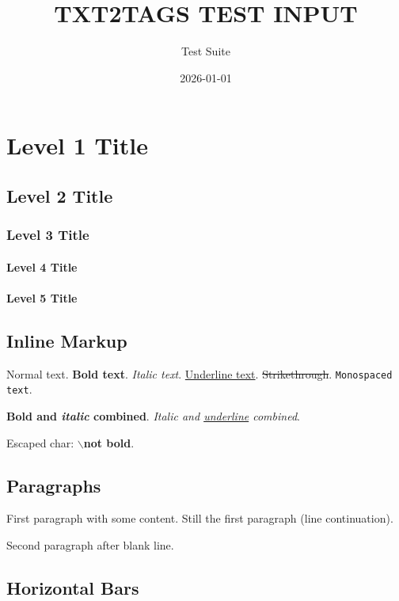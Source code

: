 \documentclass{article}
\title{TXT2TAGS TEST INPUT}
\author{Test Suite}
\begin{document}
\date{2026-01-01}
\maketitle
\clearpage


\section*{Level 1 Title}

\subsection*{Level 2 Title}

\subsubsection*{Level 3 Title}

\paragraph{}\textbf{Level 4 Title}\\


\paragraph{}\textbf{Level 5 Title}\\


\subsection*{Inline Markup}

Normal text. \textbf{Bold text}. \textit{Italic text}. \underline{Underline text}.
\sout{Strikethrough}. \texttt{Monospaced text}.

\textbf{Bold and \textit{italic} combined}. \textit{Italic and \underline{underline} combined}.

Escaped char: $\backslash$\textbf{not bold}.

\subsection*{Paragraphs}

First paragraph with some content.
Still the first paragraph (line continuation).

Second paragraph after blank line.

\subsection*{Horizontal Bars}
\end{document}
